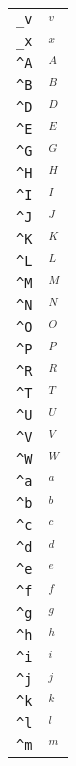 \begin{longtable}{ll}
\texttt{\_v}&${}_v{}$\\
\texttt{\_x}&${}_x{}$\\
\texttt{\textasciicircum A}&${}^A{}$\\
\texttt{\textasciicircum B}&${}^B{}$\\
\texttt{\textasciicircum D}&${}^D{}$\\
\texttt{\textasciicircum E}&${}^E{}$\\
\texttt{\textasciicircum G}&${}^G{}$\\
\texttt{\textasciicircum H}&${}^H{}$\\
\texttt{\textasciicircum I}&${}^I{}$\\
\texttt{\textasciicircum J}&${}^J{}$\\
\texttt{\textasciicircum K}&${}^K{}$\\
\texttt{\textasciicircum L}&${}^L{}$\\
\texttt{\textasciicircum M}&${}^M{}$\\
\texttt{\textasciicircum N}&${}^N{}$\\
\texttt{\textasciicircum O}&${}^O{}$\\
\texttt{\textasciicircum P}&${}^P{}$\\
\texttt{\textasciicircum R}&${}^R{}$\\
\texttt{\textasciicircum T}&${}^T{}$\\
\texttt{\textasciicircum U}&${}^U{}$\\
\texttt{\textasciicircum V}&${}^V{}$\\
\texttt{\textasciicircum W}&${}^W{}$\\
\texttt{\textasciicircum a}&${}^a{}$\\
\texttt{\textasciicircum b}&${}^b{}$\\
\texttt{\textasciicircum c}&${}^c{}$\\
\texttt{\textasciicircum d}&${}^d{}$\\
\texttt{\textasciicircum e}&${}^e{}$\\
\texttt{\textasciicircum f}&${}^f{}$\\
\texttt{\textasciicircum g}&${}^g{}$\\
\texttt{\textasciicircum h}&${}^h{}$\\
\texttt{\textasciicircum i}&${}^i{}$\\
\texttt{\textasciicircum j}&${}^j{}$\\
\texttt{\textasciicircum k}&${}^k{}$\\
\texttt{\textasciicircum l}&${}^l{}$\\
\texttt{\textasciicircum m}&${}^m{}$\\

\end{longtable}
